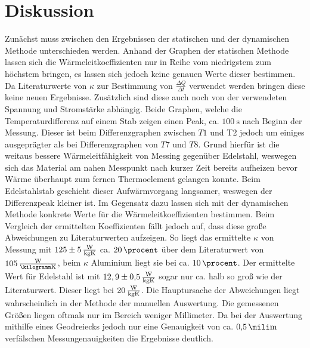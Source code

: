 
\section{Diskussion}
\label{sec:Diskussion}
Zunächst muss zwischen den Ergebnissen der statischen und der dynamischen Methode
 unterschieden werden. Anhand der Graphen der statischen Methode lassen sich
 die Wärmeleitkoeffizienten nur in Reihe vom niedrigstem zum höchstem bringen,
 es lassen sich jedoch keine genauen Werte dieser bestimmen. Da Literaturwerte
 von $\kappa$ zur Bestimmung von $\frac{\Delta Q}{\Delta t}$ verwendet werden
 bringen diese keine neuen Ergebnisse. Zusätzlich sind diese auch noch von der
 verwendeten Spannung und Stromstärke abhängig. Beide Graphen, welche die
 Temperaturdifferenz auf einem Stab zeigen einen Peak,
 ca. $\SI{100}{\second}$ nach Beginn der Messung. Dieser ist beim
 Differenzgraphen zwischen $T1$ und T2 jedoch um einiges ausgeprägter als bei
 Differenzgraphen von $T7$ und $T8$. Grund hierfür ist die weitaus bessere
 Wärmeleitfähigkeit von Messing gegenüber Edelstahl, weswegen sich das
 Material am nahen Messpunkt nach kurzer Zeit bereits aufheizen bevor Wärme
 überhaupt zum fernen Thermoelement gelangen konnte. Beim Edelstahlstab geschieht
 dieser Aufwärmvorgang langsamer, weswegen der Differenzpeak kleiner ist. Im
 Gegensatz dazu lassen sich mit der dynamischen Methode konkrete Werte für die
 Wärmeleitkoeffizienten bestimmen. Beim Vergleich der ermittelten Koeffizienten
  fällt jedoch auf, dass diese große Abweichungen zu Literaturwerten aufzeigen.
  So liegt das ermittelte $\kappa$ von Messung mit
  $125 \pm \SI{5}{\frac{\watt}{\kilogram\kelvin}}$ ca. $\SI{20}{\procent}$ über
  dem Literaturwert von $\SI{105}{\frac{\watt}{\kilogramm\kelvin}}$, beim $\kappa$
  Aluminium liegt sie bei ca. $\SI{10}{\procent}$. Der ermittelte Wert für
  Edelstahl ist mit $12,9 \pm \SI{0.5}{\frac{\watt}{\kilogram\kelvin}}$ sogar
   nur ca. halb so groß wie der Literaturwert. Dieser liegt bei $\SI{20}{\frac{\watt}{\kilogram\kelvin}}$.
   Die Hauptursache der Abweichungen liegt wahrscheinlich in der Methode der manuellen
   Auswertung. Die gemessenen Größen liegen oftmals nur im Bereich weniger Millimeter.
   Da bei der Auswertung mithilfe eines Geodreiecks jedoch nur eine
   Genauigkeit von ca. $\SI{0.5}{\mili\meter}$ verfälschen
   Messungenauigkeiten die Ergebnisse deutlich.
